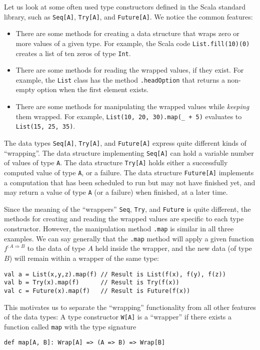 Let us look at some often used type constructors defined in the Scala
standard library, such as \lstinline!Seq[A]!, \lstinline!Try[A]!,
and \lstinline!Future[A]!. We notice the common features:
\begin{itemize}
\item There are some methods for creating a data structure that wraps zero
or more values of a given type. For example, the Scala code \lstinline!List.fill(10)(0)!
creates a list of ten zeros of type \lstinline!Int!.
\item There are some methods for reading the wrapped values, if they exist.
For example, the \lstinline!List! class has the method \lstinline!.headOption!
that returns a non-empty option when the first element exists.
\item There are some methods for manipulating the wrapped values while \emph{keeping}
them wrapped. For example, \lstinline!List(10, 20, 30).map(_ + 5)!
evaluates to \lstinline!List(15, 25, 35)!.
\end{itemize}
The data types \lstinline!Seq[A]!, \lstinline!Try[A]!, and \lstinline!Future[A]!
express quite different kinds of ``wrapping''. The data structure
implementing \lstinline!Seq[A]! can hold a variable number of values
of type \lstinline!A!. The data structure \lstinline!Try[A]! holds
either a successfully computed value of type \lstinline!A!, or a
failure. The data structure \lstinline!Future[A]! implements a computation
that has been scheduled to run but may not have finished yet, and
may return a value of type \lstinline!A! (or a failure) when finished,
at a later time.

Since the meaning of the ``wrappers'' \lstinline!Seq!, \lstinline!Try!,
and \lstinline!Future! is quite different, the methods for creating
and reading the wrapped values are specific to each type constructor.
However, the manipulation method \lstinline!.map! is similar in all
three examples. We can say generally that the \lstinline!.map! method
will apply a given function $f^{:A\Rightarrow B}$ to the data of
type $A$ held inside the wrapper, and the new data (of type $B$)
will remain within a wrapper of the same type:
\begin{lstlisting}
val a = List(x,y,z).map(f) // Result is List(f(x), f(y), f(z))
val b = Try(x).map(f)      // Result is Try(f(x))
val c = Future(x).map(f)   // Result is Future(f(x))
\end{lstlisting}
This motivates us to separate the ``wrapping'' functionality from
all other features of the data types: A type constructor \lstinline!W[A]!
is a ``wrapper'' if there exists a function called \lstinline!map!
with the  type signature
\begin{lstlisting}
def map[A, B]: Wrap[A] => (A => B) => Wrap[B]
\end{lstlisting}

